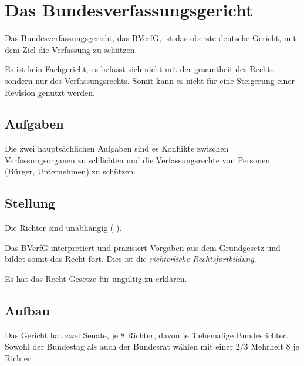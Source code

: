 \documentclass{article}
\begin{document}
\section{Das Bundesverfassungsgericht}
Das Bundesverfassungsgericht, das BVerfG, ist das oberste deutsche Gericht, mit dem Ziel die Verfassung zu schützen.

Es ist kein Fachgericht; es befasst sich nicht mit der gesamtheit des Rechts, sondern nur des Verfassungsrechts. Somit kann es \idr nicht für eine Steigerung einer Revision genutzt werden.

 \GG {}

\subsection{Aufgaben}
Die zwei hauptsächlichen Aufgaben sind es Konflikte zwischen Verfassungsorganen zu schlichten und die Verfassungsrechte von Personen (Bürger, Unternehmen) zu schützen.

\subsection{Stellung}
Die Richter sind unabhängig (  \GG).

Das BVerfG interpretiert und präzisiert Vorgaben aus dem Grundgesetz und bildet somit das Recht fort. Dies ist die \emph{richterliche Rechtsfortbildung}.

Es hat das Recht Gesetze für ungültig zu erklären.

\subsection{Aufbau}
Das Gericht hat zwei Senate, je 8 Richter, davon je 3 ehemalige Bundesrichter. Sowohl der Bundestag als auch der Bundesrat wählen mit einer $2/3$ Mehrheit 8 je Richter.
\end{document}
